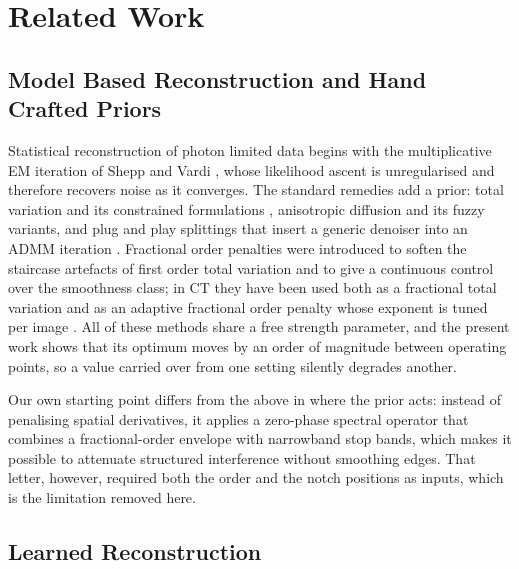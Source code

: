 \section{Related Work}
\label{sec:related}

\subsection{Model Based Reconstruction and Hand Crafted Priors}

Statistical reconstruction of photon limited data begins with the
multiplicative EM iteration of Shepp and Vardi \cite{shepp1982}, whose
likelihood ascent is unregularised and therefore recovers noise as it
converges. The standard remedies add a prior: total variation and its
constrained formulations \cite{sidky2008}, anisotropic diffusion
\cite{perona1990} and its fuzzy variants, and plug and play splittings that
insert a generic denoiser into an ADMM iteration
\cite{venkatakrishnan2013}. Fractional order penalties were introduced to
soften the staircase artefacts of first order total variation and to give a
continuous control over the smoothness class; in CT they have been used both
as a fractional total variation and as an adaptive fractional order penalty
whose exponent is tuned per image \cite{zhang2016fractional}. All of these
methods share a free strength parameter, and the present work shows that its
optimum moves by an order of magnitude between operating points, so a value
carried over from one setting silently degrades another.

Our own starting point \cite{singh2026spl} differs from the above in where
the prior acts: instead of penalising spatial derivatives, it applies a
zero-phase spectral operator that combines a fractional-order envelope with
narrowband stop bands, which makes it possible to attenuate structured
interference without smoothing edges. That letter, however, required both the
order and the notch positions as inputs, which is the limitation removed
here.

\subsection{Learned Reconstruction}

